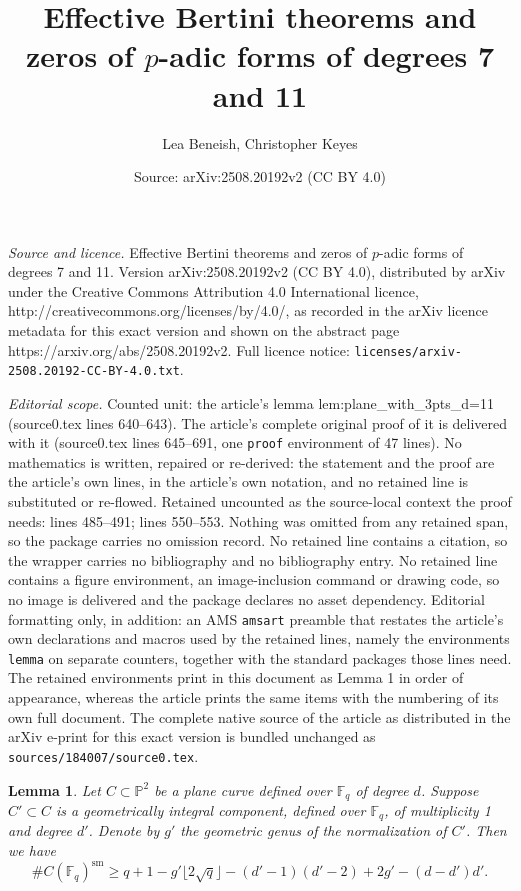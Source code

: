 \documentclass[10pt,a4paper]{amsart}
\title{Effective Bertini theorems and zeros of $p$-adic forms of degrees 7 and 11}
\author{Lea Beneish, Christopher Keyes}
\date{Source: arXiv:2508.20192v2 (CC BY 4.0)}
\newtheorem{lemma}{Lemma}
\newcommand{\F}{\mathbb{F}}
\renewcommand{\P}{\mathbb{P}}
\newcommand{\sm}{\mathrm{sm}}
\begin{document}
\maketitle

\noindent\emph{Source and licence.} Effective Bertini theorems and zeros of $p$-adic forms of degrees 7 and 11. Version arXiv:2508.20192v2 (CC BY 4.0), distributed by arXiv under the Creative Commons Attribution 4.0 International licence, http://creativecommons.org/licenses/by/4.0/, as recorded in the arXiv licence metadata for this exact version and shown on the abstract page https://arxiv.org/abs/2508.20192v2. Full licence notice: \texttt{licenses/arxiv-2508.20192-CC-BY-4.0.txt}.\par\smallskip

\noindent\textit{Editorial scope.} Counted unit: the article's lemma lem:plane\_with\_3pts\_d=11 (source0.tex lines 640--643). The article's complete original proof of it is delivered with it (source0.tex lines 645--691, one \texttt{proof} environment of 47 lines). No mathematics is written, repaired or re-derived: the statement and the proof are the article's own lines, in the article's own notation, and no retained line is substituted or re-flowed.  Retained uncounted as the source-local context the proof needs: lines 485--491; lines 550--553.  Nothing was omitted from any retained span, so the package carries no omission record.  No retained line contains a citation, so the wrapper carries no bibliography and no bibliography entry.  No retained line contains a figure environment, an image-inclusion command or drawing code, so no image is delivered and the package declares no asset dependency.  Editorial formatting only, in addition: an AMS \texttt{amsart} preamble that restates the article's own declarations and macros used by the retained lines, namely the environments \texttt{lemma} on separate counters, together with the standard packages those lines need.  The retained environments print in this document as Lemma 1 in order of appearance, whereas the article prints the same items with the numbering of its own full document.  The complete native source of the article as distributed in the arXiv e-print for this exact version is bundled unchanged as \texttt{sources/184007/source0.tex}.
\begin{lemma}
\label{lem:finding_sm_pt}
    Let $C \subset \P^2$ be a plane curve defined over $\F_q$ of degree $d$. Suppose $C' \subset C$ is a geometrically integral component, defined over $\F_q$, of multiplicity 1 and degree $d'$. Denote by $g'$ the geometric genus of the normalization of $C'$. Then we have
    \begin{equation}\label{eq:ns_pt_bound}
        \#C(\F_q)^{\sm} \geq q+1 - g' \lfloor 2\sqrt{q} \rfloor - (d'-1)(d'-2) + 2g' - (d-d')d'.
    \end{equation}
\end{lemma}
\end{document}

